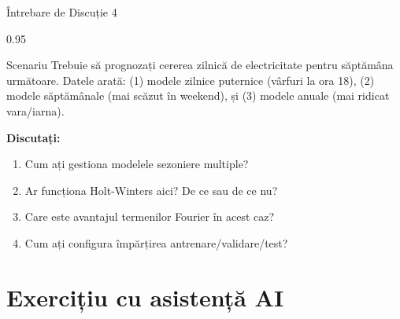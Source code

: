 \documentclass[9pt, aspectratio=169, t]{beamer}
\begin{document}
\begin{frame}{Întrebare de Discuție 4}
    \begin{cminipage}{0.95\textwidth}
    \begin{block}{Scenariu}
        Trebuie să prognozați cererea zilnică de electricitate pentru săptămâna următoare. Datele arată: (1) modele zilnice puternice (vârfuri la ora 18), (2) modele săptămânale (mai scăzut în weekend), și (3) modele anuale (mai ridicat vara/iarna).
    \end{block}

    \vspace{0.4cm}

    \textbf{Discutați:}
    \begin{enumerate}\setlength{\itemsep}{0pt}
        \item Cum ați gestiona modelele sezoniere multiple?
        \item Ar funcționa Holt-Winters aici? De ce sau de ce nu?
        \item Care este avantajul termenilor Fourier în acest caz?
        \item Cum ați configura împărțirea antrenare/validare/test?
    \end{enumerate}
    \end{cminipage}
\end{frame}

\section{Exercițiu cu asistență AI}
\end{document}
